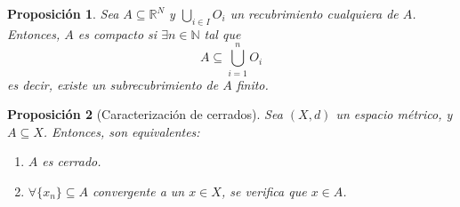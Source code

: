 \documentclass[11pt, a4paper, titlepage]{article}
\theoremstyle{theorem-style}
\newtheorem*{nprop}{Proposición}
\theoremstyle{definition-style}
\theoremstyle{remark-style}
\theoremstyle{example-style}
\newenvironment{nlist}
{\begin{enumerate}
\renewcommand\labelenumi{(\emph{\roman{enumi})}}}
{\end{enumerate}}
\begin{document}
\begin{nprop}
	Sea $A \subseteq \mathbb{R}^N$ y $\bigcup_{i\in I} O_i$ un recubrimiento cualquiera de $A$. Entonces, $A$ es compacto si $\exists n\in \mathbb N$ tal que 
	\[
	A \subseteq \bigcup_{i=1}^n O_i
	\]
	es decir, existe un subrecubrimiento de $A$ finito.
\end{nprop}

\begin{nprop}[Caracterización de cerrados]
Sea $(X,d)$ un espacio métrico, y $A\subseteq X$. Entonces, son equivalentes:

\begin{nlist}
\item $A$ es cerrado.
\item $\forall \{x_n\} \subseteq A$ convergente a un $x \in X$, se verifica que $x\in A$.
\end{nlist}

\end{nprop}
\end{document}
